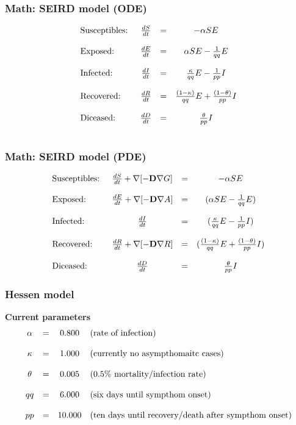 \documentclass{beamer}
\begin{document}
\begin{frame}
	\frametitle{Math: SEIRD model (ODE)}
	\[
	\begin{array}{ l c c c }
		\text{Susceptibles: }& \frac{dS}{dt} & = & -\alpha SE  \\ \\
		\text{Exposed: }& \frac{dE}{dt} & = & \alpha SE-\frac{1}{qq}E\\ \\
		\text{Infected: }& \frac{dI}{dt} & = & \frac{\kappa}{qq} E-\frac{1}{pp}I\\ \\
		\text{Recovered: }& \frac{dR}{dt} & = & \frac{(1-\kappa)}{qq} E+\frac{(1-\theta)}{pp}I\\ \\
		\text{Diceased: }& \frac{dD}{dt} & = & \frac{\theta}{pp} I \\ \\
	\end{array}	
	\]
\end{frame}

\begin{frame}
	\frametitle{Math: SEIRD model (PDE)} 
	\[
	\begin{array}{ l c c c }
		\text{Susceptibles: }& \frac{d S}{dt} + \nabla[- \text{\textbf{D}} \nabla G] & = & - \alpha SE \\ \\
		\text{Exposed: }& \frac{d E}{dt} + \nabla[- \text{\textbf{D}} \nabla A] & = & (\alpha SE-\frac{1}{qq}E)\\ \\
		\text{Infected: }& \frac{d I}{dt} & = & (\frac{\kappa}{qq} E-\frac{1}{pp}I)\\ \\
		\text{Recovered: }& \frac{d R}{dt} + \nabla[- \text{\textbf{D}} \nabla R]
			& = & (\frac{(1-\kappa)}{qq} E+\frac{(1-\theta)}{pp}I)\\ \\
		\text{Diceased: }& \frac{d D}{dt} & = & \frac{\theta}{pp} I
	\end{array}	
	\]
\end{frame}

\begin{frame}
	\frametitle{Hessen model} 
	\textbf{Current parameters}
	\[
	\begin{array}{ c c c l }
		\alpha & = & 0.800 & \text{(rate of infection)}\\ \\
		\kappa & = & 1.000 & \text{(currently no asympthomaitc cases)}\\ \\
		\theta & = & 0.005 & \text{(0.5\% mortality/infection rate)}\\ \\
		qq & = & 6.000 & \text{(six days until sympthom onset)}\\ \\
		pp & = & 10.000 & \text{(ten days until recovery/death after sympthom onset)}
	\end{array}	
	\]
\end{frame}
\end{document}
